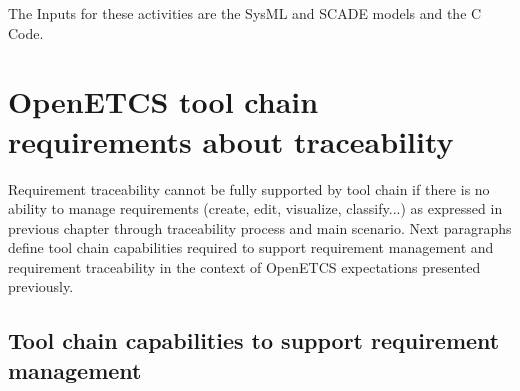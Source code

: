 \documentclass[11pt]{template/openetcs_report}
\begin{document}
The Inputs for these activities are the SysML and SCADE models and the C Code.



\chapter{OpenETCS tool chain requirements about traceability}
\label{sec-3} 
Requirement traceability cannot be fully supported by tool chain if there is no ability to manage requirements (create, edit, visualize, classify...) as expressed in previous chapter through traceability process and main scenario.
Next paragraphs define tool chain capabilities required to support requirement management and requirement traceability in the context of OpenETCS expectations presented previously.

\section{Tool chain capabilities to support requirement management}
\end{document}

